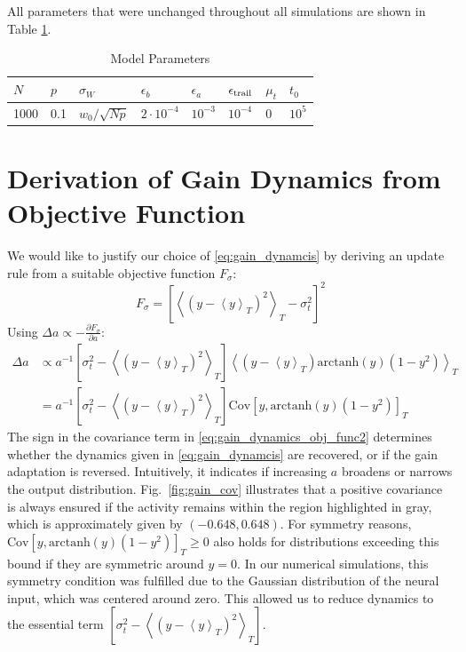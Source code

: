 \documentclass[10pt,a4paper]{article}
\newcommand{\avgt}[1]{\left< #1 \right>_T}
\begin{document}
All parameters that were unchanged throughout all simulations are shown in Table \ref{tab:params}.

\begin{table}[h]
	\caption{Model Parameters}
	\centering
	\vspace{5pt}
	\begin{tabular}{ l | l | l | l | l | l | l | l }
		 $N$ & $p$ & $\sigma_{W}$ & $\epsilon_{b}$ & $\epsilon_{a}$ & $\epsilon_{\rm trail}$ & $\mu_{t}$ & $t_0$  \\
		\hline
		\hline
		\rule{0pt}{12pt}
		1000 & 0.1 & $ w_0 / \sqrt{N p}$ & $2\cdot 10^{-4}$ & $10^{-3}$ & $10^{-4}$ & 0 & $10^5$
	\end{tabular}
	\label{tab:params}
\end{table}

\section{Derivation of Gain Dynamics from Objective Function}
We would like to justify our choice of \eqref{eq:gain_dynamcis} by deriving an update rule from a suitable objective function $F_{\sigma}$:
\begin{equation}
F_{\sigma} = \left[\avgt{\left(y-\avgt{y}\right)^2} - \sigma^2_{t}\right]^2
\end{equation}
Using $\Delta a \propto - \frac{\partial F_\sigma}{\partial a}$:
\begin{align}
\Delta a &\propto a^{-1} \left[\sigma^2_{t} - \avgt{\left(y-\avgt{y}\right)^2}\right]\avgt{\left(y-\avgt{y}\right)\mathrm{arctanh}(y)\left(1-y^2\right)} \label{eq:gain_dynamics_obj_func1} \\
&=a^{-1} \left[\sigma^2_{t} - \avgt{\left(y-\avgt{y}\right)^2}\right]\mathrm{Cov}\left[ y,\mathrm{arctanh}(y)\left(1-y^2\right) \right]_T \label{eq:gain_dynamics_obj_func2}
\end{align}
The sign in the covariance term in \eqref{eq:gain_dynamics_obj_func2} determines whether the dynamics given in \eqref{eq:gain_dynamcis} are recovered, or if the gain adaptation is reversed. Intuitively, it indicates if increasing $a$ broadens or narrows the output distribution. Fig.~\ref{fig:gain_cov} illustrates that a positive covariance is always ensured if the activity remains within the region highlighted in gray, which is approximately given by $(-0.648,0.648)$. For symmetry reasons, $\mathrm{Cov}\left[ y,\mathrm{arctanh}(y)\left(1-y^2\right) \right]_T \geq 0$ also holds for distributions exceeding this bound if they are symmetric around $y=0$. In our numerical simulations, this symmetry condition was fulfilled due to the Gaussian distribution of the neural input, which was centered around zero. This allowed us to reduce dynamics to the essential term $\left[\sigma^2_{t} - \avgt{\left(y-\avgt{y}\right)^2}\right]$.
\end{document}
